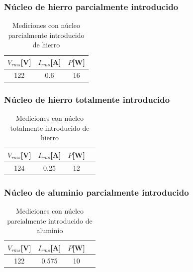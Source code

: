 \documentclass{article}
\begin{document}
            \subsubsection{Núcleo de hierro parcialmente introducido}

            \begin{table}[H]
                \centering
                \begin{tabular}{|c|c|c|}
                    \hline
                    $V_{rms} $[V] & $I_{rms} $[A] & $P $[W] \\ \hline
                    122           & 0.6         & 16    \\ \hline
                \end{tabular}
                \caption{Mediciones con núcleo parcialmente introducido de hierro}
                \label{tab:mediciones-nucleo-parcialmente-introducido-hierro}
            \end{table}

            \subsubsection{Núcleo de hierro totalmente introducido}

            \begin{table}[H]
                \centering
                \begin{tabular}{|c|c|c|c|}
                    \hline
                    $V_{rms} $[V] & $I_{rms} $[A] & $P $[W] \\ \hline
                    124           & 0.25         & 12    \\ \hline
                \end{tabular}
                \caption{Mediciones con núcleo totalmente introducido de hierro}
                \label{tab:mediciones-nucleo-totalmente-introducido-hierro}
            \end{table}

            \subsubsection{Núcleo de aluminio parcialmente introducido}

            \begin{table}[H]
                \centering
                \begin{tabular}{|c|c|c|c|}
                    \hline
                    $V_{rms} $[V] & $I_{rms} $[A] & $P $[W] \\ \hline
                    122           & 0.575         & 10    \\ \hline
                \end{tabular}
                \caption{Mediciones con núcleo parcialmente introducido de aluminio}
                \label{tab:mediciones-nucleo-parcialmente-introducido-aluminio}
            \end{table}
\end{document}
